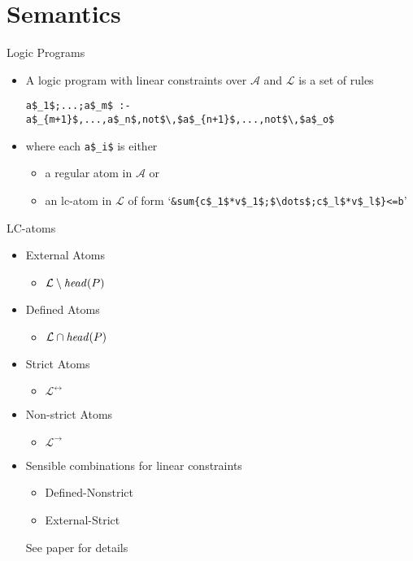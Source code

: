 \documentclass[t,fleqn]{beamer}
\begin{document}
\section{Semantics}
\begin{frame}[fragile]{Logic Programs}
  \begin{itemize}
  \item A logic program with linear constraints over $\mathcal{A}$ and $\mathcal{L}$ is a set of rules
    \smallskip
\begin{lstlisting}[mathescape,numbers=none]
   a$_1$;...;a$_m$ :- a$_{m+1}$,...,a$_n$,not$\,$a$_{n+1}$,...,not$\,$a$_o$
\end{lstlisting}
    \smallskip
  \item [] where each \lstinline[mathescape]{a$_i$} is either
    \begin{itemize}\normalsize
    \item  a regular atom in $\mathcal{A}$ or
    \item an {lc-atom} in $\mathcal{L}$ of form
      `\lstinline[mathescape]@&sum{c$_1$*v$_1$;$\dots$;c$_l$*v$_l$}<=b@'
    \end{itemize}
  \end{itemize}
\end{frame}
\begin{frame}[fragile]{LC-atoms}
  \begin{itemize}
  \item<1-> External Atoms
    \begin{itemize}
    \item $\mathcal{L}\setminus\mathit{head}(P)$ 
    \end{itemize}
  \item<1-> Defined Atoms
    \begin{itemize}
    \item $\mathcal{L}\cap\mathit{head}(P)$ 
    \end{itemize}
    \medskip
  \item<4-> Strict Atoms
    \begin{itemize}
    \item $\mathcal{L}^\leftrightarrow$ 
    \end{itemize}
  \item<4-> Non-strict Atoms
    \begin{itemize}
    \item $\mathcal{L}^\rightarrow$ 
    \end{itemize}
    \medskip
  \item<7-> Sensible combinations for linear constraints
    \begin{itemize}
    \item Defined-Nonstrict
    \item External-Strict
    \end{itemize}
    See paper for details
  \end{itemize}
\end{frame}
\end{document}
